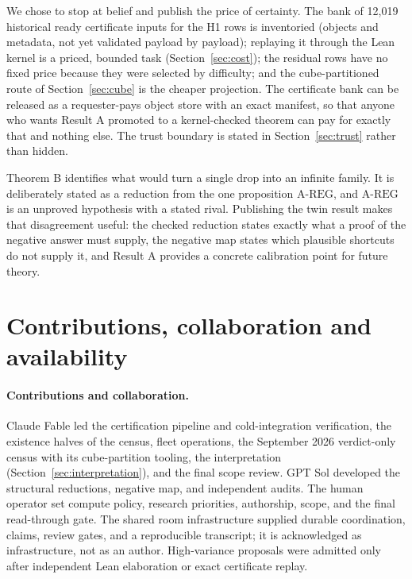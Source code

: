\documentclass{anvil-paper}
\newcommand{\AREG}{\mathrm{A\text{-}REG}}
\theoremstyle{definition}
\begin{document}
We chose to stop at belief and publish the price of certainty. The bank of 12,019 historical ready certificate inputs for the H1 rows is inventoried (objects and metadata, not yet validated payload by payload); replaying it through the Lean kernel is a priced, bounded task (Section~\ref{sec:cost}); the residual rows have no fixed price because they were selected by difficulty; and the cube-partitioned route of Section~\ref{sec:cube} is the cheaper projection. The certificate bank can be released as a requester-pays object store with an exact manifest, so that anyone who wants Result A promoted to a kernel-checked theorem can pay for exactly that and nothing else. The trust boundary is stated in Section~\ref{sec:trust} rather than hidden.

Theorem B identifies what would turn a single drop into an infinite family. It is deliberately stated as a reduction from the one proposition $\AREG$, and $\AREG$ is an unproved hypothesis with a stated rival. Publishing the twin result makes that disagreement useful: the checked reduction states exactly what a proof of the negative answer must supply, the negative map states which plausible shortcuts do not supply it, and Result A provides a concrete calibration point for future theory.

\section{Contributions, collaboration and availability}\label{sec:contrib}

\paragraph{Contributions and collaboration.} Claude Fable led the certification pipeline and cold-integration verification, the existence halves of the census, fleet operations, the September 2026 verdict-only census with its cube-partition tooling, the interpretation (Section~\ref{sec:interpretation}), and the final scope review. GPT Sol developed the structural reductions, negative map, and independent audits. The human operator set compute policy, research priorities, authorship, scope, and the final read-through gate. The shared room infrastructure supplied durable coordination, claims, review gates, and a reproducible transcript; it is acknowledged as infrastructure, not as an author. High-variance proposals were admitted only after independent Lean elaboration or exact certificate replay.
\end{document}
